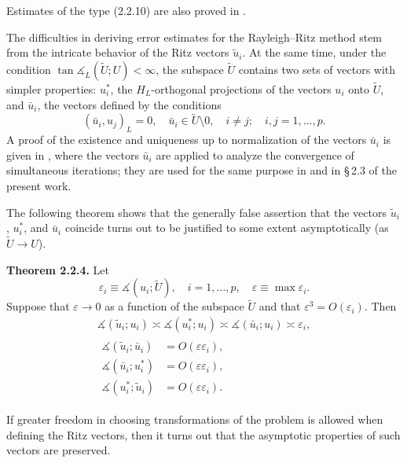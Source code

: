 \documentclass[11pt,oneside]{book}
\newcommand{\ang}{\measuredangle}
\begin{document}
Estimates of the type (2.2.10) are also proved in \citep{StrangFix1973}.

The difficulties in deriving error estimates for the Rayleigh--Ritz method stem from the intricate behavior of the Ritz vectors $\tilde{u}_i$. At the same time, under the condition $\tan \ang_L(\widetilde{U}; U) < \infty$, the subspace $\widetilde{U}$ contains two sets of vectors with simpler properties: $u_i^*$, the $H_L$-orthogonal projections of the vectors $u_i$ onto $\widetilde{U}$, and $\bar{u}_i$, the vectors defined by the conditions
\[
(\bar{u}_i, u_j)_L = 0, \quad \bar{u}_i \in \widetilde{U} \setminus 0, \quad i \neq j; \quad i, j = 1, \ldots, p. \tag{2.2.11}
\]
A proof of the existence and uniqueness up to normalization of the vectors $\bar{u}_i$ is given in \citep{FaddeevFaddeeva1963}, where the vectors $\bar{u}_i$ are applied to analyze the convergence of simultaneous iterations; they are used for the same purpose in \citep{Parlett1983} and in \S\,2.3 of the present work.

The following theorem shows that the generally false assertion that the vectors $\tilde{u}_i$, $u_i^*$, and $\bar{u}_i$ coincide turns out to be justified to some extent asymptotically (as $\widetilde{U} \to U$).

\textbf{Theorem 2.2.4.} Let
\[
\varepsilon_i \equiv \ang(u_i; \widetilde{U}), \quad i = 1, \ldots, p, \quad \varepsilon \equiv \max \varepsilon_i .
\]
Suppose that $\varepsilon \to 0$ as a function of the subspace $\widetilde{U}$ and that $\varepsilon^3 = O(\varepsilon_i)$. Then
\begin{gather*}
\ang(\tilde{u}_i; u_i) \asymp \ang(u_i^*; u_i) \asymp \ang(\bar{u}_i; u_i) \asymp \varepsilon_i , \tag{2.2.12} \\
\begin{aligned}
\ang(\tilde{u}_i; \bar{u}_i) &= O(\varepsilon \varepsilon_i) , \\
\ang(\bar{u}_i; u_i^*) &= O(\varepsilon \varepsilon_i) , \\
\ang(u_i^*; \tilde{u}_i) &= O(\varepsilon \varepsilon_i) .
\end{aligned}
\tag{2.2.13}
\end{gather*}

If greater freedom in choosing transformations of the problem is allowed when defining the Ritz vectors, then it turns out that the asymptotic properties of such vectors are preserved.
\end{document}
